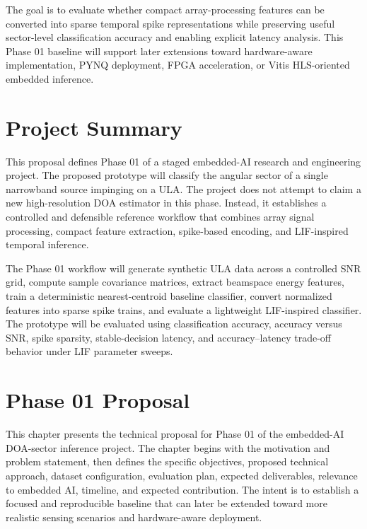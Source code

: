\documentclass[11pt]{report}
\begin{document}
The goal is to evaluate whether compact array-processing features can be converted into sparse temporal spike representations while preserving useful sector-level classification accuracy and enabling explicit latency analysis. This Phase 01 baseline will support later extensions toward hardware-aware implementation, PYNQ deployment, FPGA acceleration, or Vitis HLS-oriented embedded inference.

\clearpage

\chapter*{Project Summary}

This proposal defines Phase 01 of a staged embedded-AI research and engineering project. The proposed prototype will classify the angular sector of a single narrowband source impinging on a ULA. The project does not attempt to claim a new high-resolution DOA estimator in this phase. Instead, it establishes a controlled and defensible reference workflow that combines array signal processing, compact feature extraction, spike-based encoding, and LIF-inspired temporal inference.

The Phase 01 workflow will generate synthetic ULA data across a controlled SNR grid, compute sample covariance matrices, extract beamspace energy features, train a deterministic nearest-centroid baseline classifier, convert normalized features into sparse spike trains, and evaluate a lightweight LIF-inspired classifier. The prototype will be evaluated using classification accuracy, accuracy versus SNR, spike sparsity, stable-decision latency, and accuracy--latency trade-off behavior under LIF parameter sweeps.

\clearpage
\tableofcontents
\clearpage
\listoffigures
\clearpage
\listoftables
\clearpage


\chapter{Phase 01 Proposal}

This chapter presents the technical proposal for Phase 01 of the embedded-AI DOA-sector inference project. The chapter begins with the motivation and problem statement, then defines the specific objectives, proposed technical approach, dataset configuration, evaluation plan, expected deliverables, relevance to embedded AI, timeline, and expected contribution. The intent is to establish a focused and reproducible baseline that can later be extended toward more realistic sensing scenarios and hardware-aware deployment.
\end{document}

